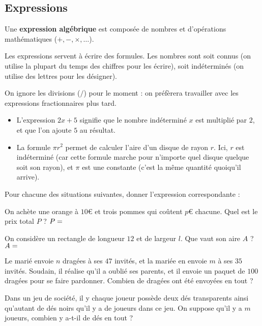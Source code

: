 \documentclass{poly}
\begin{document}
\subsection{Expressions}
\begin{definition}
Une \textbf{expression algébrique} est composée de nombres et d'opérations mathématiques ($+, -, \times, \dots$).
\end{definition}
Les expressions servent à écrire des formules. Les nombres sont soit connus (on utilise la plupart du temps des chiffres pour les écrire), soit indéterminés (on utilise des lettres pour les désigner).
\begin{remark}
On ignore les divisions ($/$) pour le moment : on préfèrera travailler avec les expressions fractionnaires plus tard.
\end{remark}
\begin{example}
\hfill
\begin{itemize}
\item L'expression $2x + 5$ signifie que le nombre indéterminé $x$ est multiplié par $2$, et que l'on ajoute $5$ au résultat.
\item La formule $\pi r^2$ permet de calculer l'aire d'un disque de rayon $r$. Ici, $r$ est indéterminé (car cette formule marche pour n'importe quel disque quelque soit son rayon), et $\pi$ est une constante (c'est la même quantité quoiqu'il arrive).
\end{itemize}
\end{example}
\begin{exercize}
Pour chacune des situations suivantes, donner l'expression correspondante :
\begin{alphaquestions}
\item On achète une orange à $10$€ et trois pommes qui coûtent $p$€ chacune. Quel est le prix total $P$ ? $P = \answerline{}$
\item On considère un rectangle de longueur $12$ et de largeur $l$. Que vaut son aire $A$ ? $A = \answerline$
\item Le marié envoie $n$ dragées à ses $47$ invités, et la mariée en envoie $m$ à ses $35$ invités. Soudain, il réalise qu'il a oublié ses parents, et il envoie un paquet de $100$ dragées pour se faire pardonner. Combien de dragées ont été envoyées en tout ? \answerline
\item Dans un jeu de société, il y chaque joueur possède deux dés transparents ainsi qu'autant de dés noirs qu'il y a de joueurs dans ce jeu. On suppose qu'il y a $m$ joueurs, combien y a-t-il de dés en tout ? \answerline 
\end{alphaquestions}
\end{exercize}
\end{document}
